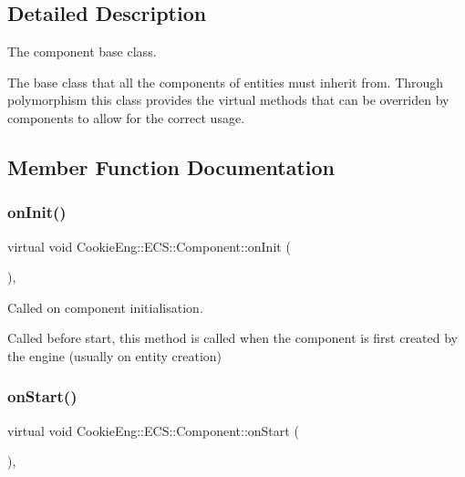 \subsection{Detailed Description}
The component base class. 

The base class that all the components of entities must inherit from. Through polymorphism this class provides the virtual methods that can be overriden by components to allow for the correct usage. 

\subsection{Member Function Documentation}
\mbox{\label{class_cookie_eng_1_1_e_c_s_1_1_component_a4b02b630558005a9c4723cf15b8b03d6}} 
\subsubsection{\texorpdfstring{on\+Init()}{onInit()}}
{\footnotesize\ttfamily virtual void Cookie\+Eng\+::\+E\+C\+S\+::\+Component\+::on\+Init (\begin{DoxyParamCaption}{ }\end{DoxyParamCaption})\hspace{0.3cm}{\ttfamily [inline]}, {\ttfamily [virtual]}}



Called on component initialisation. 

Called before start, this method is called when the component is first created by the engine (usually on entity creation) \mbox{\label{class_cookie_eng_1_1_e_c_s_1_1_component_aaf8523586d57c3e40d4149f228755139}} 
\subsubsection{\texorpdfstring{on\+Start()}{onStart()}}
{\footnotesize\ttfamily virtual void Cookie\+Eng\+::\+E\+C\+S\+::\+Component\+::on\+Start (\begin{DoxyParamCaption}{ }\end{DoxyParamCaption})\hspace{0.3cm}{\ttfamily [inline]}, {\ttfamily [virtual]}}




